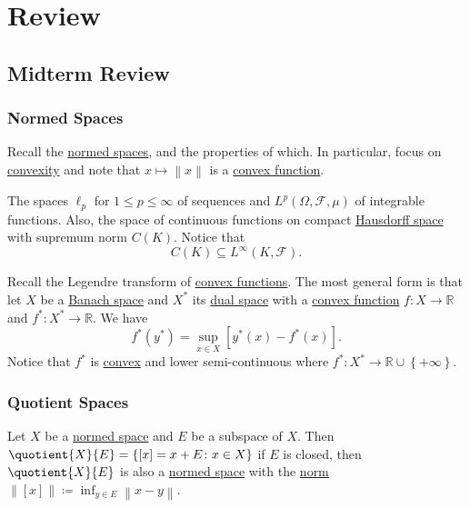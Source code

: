 \chapter{Review}
\section{Midterm Review}\label{sec:mid-review}
\subsection{Normed Spaces}
Recall the \hyperref[def:normed-vector-space]{normed spaces}, and the properties of which. In particular, focus on \hyperref[def:convex-function]{convexity} and note that \(x\mapsto \left\lVert x\right\rVert \) is a \hyperref[def:convex-function]{convex function}.

\begin{eg}
	The spaces \(\ell _p\) for \(1 \leq p \leq \infty \) of sequences and \(L^p(\Omega , \mathcal{F} , \mu )\) of integrable functions. Also, the space of continuous functions on compact \hyperref[def:Hausdorff]{Hausdorff space} with supremum norm \(C(K)\). Notice that
	\[
		C(K) \subseteq L^{\infty} (K, \mathcal{F}).
	\]
\end{eg}

\begin{remark}
	Recall the Legendre transform of \hyperref[def:convex-function]{convex functions}. The most general form is that let \(X\) be a \hyperref[def:Banach-space]{Banach space} and \(X^{\ast} \) its \hyperref[def:dual-space]{dual space} with a \hyperref[def:convex-function]{convex function} \(f\colon X\to \mathbb{R} \) and \(f^{\ast} \colon X^{\ast} \to \mathbb{R} \). We have
	\[
		f^{\ast} (y^{\ast} ) = \sup _{x\in X}\left[ y^{\ast} (x) - f^{\ast} (x) \right].
	\]
	Notice that \(f^{\ast} \) is \hyperref[def:convex-function]{convex} and lower semi-continuous where \(f^{\ast} \colon X^{\ast} \to \mathbb{R} \cup \left\{ +\infty  \right\} \).
\end{remark}

\subsection{Quotient Spaces}
Let \(X\) be a \hyperref[def:normed-vector-space]{normed space} and \(E\) be a subspace of \(X\). Then \(\quotient{X}{E} = \left\{ [x] = x+E\colon x\in X \right\}  \) if \(E\) is closed, then \(\quotient{X}{E} \) is also a \hyperref[def:normed-vector-space]{normed space} with the \hyperref[def:norm]{norm} \(\left\lVert [x]\right\rVert \coloneqq \inf _{y\in E}\left\lVert x- y\right\rVert\).


